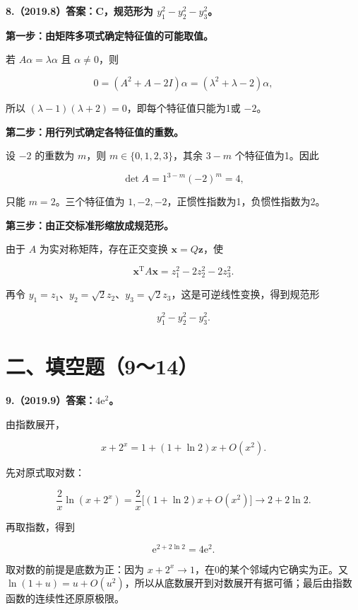 \documentclass[UTF8,11pt,fontset=windows]{ctexart}
\begin{document}
\clearpage

\textbf{8.（2019.8）答案：C，规范形为 $y_1^2-y_2^2-y_3^2$。}

\textbf{第一步：由矩阵多项式确定特征值的可能取值。}

若 $A\alpha=\lambda\alpha$ 且 $\alpha\ne0$，则

$$
0=(A^2+A-2I)\alpha=(\lambda^2+\lambda-2)\alpha,
$$

所以 $(\lambda-1)(\lambda+2)=0$，即每个特征值只能为1或 $-2$。

\textbf{第二步：用行列式确定各特征值的重数。}

设 $-2$ 的重数为 $m$，则 $m\in\{0,1,2,3\}$，其余 $3-m$ 个特征值为1。因此

$$
\det A=1^{3-m}(-2)^m=4,
$$

只能 $m=2$。三个特征值为 $1,-2,-2$，正惯性指数为1，负惯性指数为2。

\textbf{第三步：由正交标准形缩放成规范形。}

由于 $A$ 为实对称矩阵，存在正交变换 $\boldsymbol x=Q\boldsymbol z$，使

$$
\boldsymbol x^{\mathrm T}A\boldsymbol x=z_1^2-2z_2^2-2z_3^2.
$$

再令 $y_1=z_1$、$y_2=\sqrt2z_2$、$y_3=\sqrt2z_3$，这是可逆线性变换，得到规范形

$$
\boxed{y_1^2-y_2^2-y_3^2.}
$$

\clearpage

\section*{二、填空题（9～14）}

\textbf{9.（2019.9）答案：$4\mathrm e^2$。}

由指数展开，

$$
x+2^x=1+(1+\ln2)x+O(x^2).
$$

先对原式取对数：

$$
\frac2x\ln(x+2^x)
=\frac2x\bigl[(1+\ln2)x+O(x^2)\bigr]
\longrightarrow2+2\ln2.
$$

再取指数，得到

$$
\mathrm e^{2+2\ln2}=4\mathrm e^2.
$$

取对数的前提是底数为正：因为 $x+2^x\to1$，在0的某个邻域内它确实为正。又 $\ln(1+u)=u+O(u^2)$，所以从底数展开到对数展开有据可循；最后由指数函数的连续性还原原极限。

\clearpage
\end{document}
